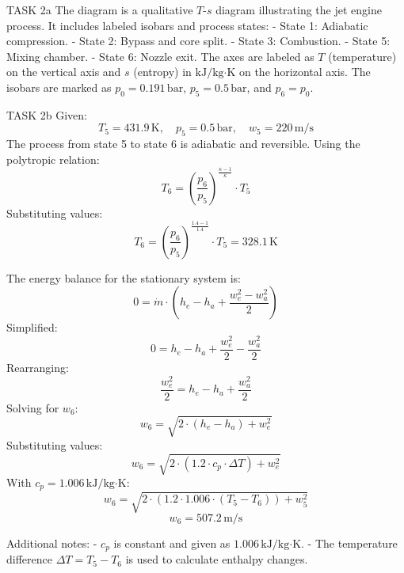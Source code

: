 TASK 2a  
The diagram is a qualitative \( T \)-\( s \) diagram illustrating the jet engine process. It includes labeled isobars and process states:  
- State 1: Adiabatic compression.  
- State 2: Bypass and core split.  
- State 3: Combustion.  
- State 5: Mixing chamber.  
- State 6: Nozzle exit.  
The axes are labeled as \( T \) (temperature) on the vertical axis and \( s \) (entropy) in \( \text{kJ}/\text{kg·K} \) on the horizontal axis. The isobars are marked as \( p_0 = 0.191 \, \text{bar} \), \( p_5 = 0.5 \, \text{bar} \), and \( p_6 = p_0 \).  

TASK 2b  
Given:  
\[
T_5 = 431.9 \, \text{K}, \quad p_5 = 0.5 \, \text{bar}, \quad w_5 = 220 \, \text{m/s}
\]  
The process from state 5 to state 6 is adiabatic and reversible. Using the polytropic relation:  
\[
T_6 = \left( \frac{p_6}{p_5} \right)^{\frac{\kappa - 1}{\kappa}} \cdot T_5
\]  
Substituting values:  
\[
T_6 = \left( \frac{p_6}{p_5} \right)^{\frac{1.4 - 1}{1.4}} \cdot T_5 = 328.1 \, \text{K}
\]  

The energy balance for the stationary system is:  
\[
0 = \dot{m} \cdot \left( h_e - h_a + \frac{w_e^2 - w_a^2}{2} \right)
\]  
Simplified:  
\[
0 = h_e - h_a + \frac{w_e^2}{2} - \frac{w_a^2}{2}
\]  
Rearranging:  
\[
\frac{w_e^2}{2} = h_e - h_a + \frac{w_a^2}{2}
\]  
Solving for \( w_6 \):  
\[
w_6 = \sqrt{2 \cdot (h_e - h_a) + w_e^2}
\]  
Substituting values:  
\[
w_6 = \sqrt{2 \cdot (1.2 \cdot c_p \cdot \Delta T) + w_e^2}
\]  
With \( c_p = 1.006 \, \text{kJ}/\text{kg·K} \):  
\[
w_6 = \sqrt{2 \cdot (1.2 \cdot 1.006 \cdot (T_5 - T_6)) + w_5^2}
\]  
\[
w_6 = 507.2 \, \text{m/s}
\]  

Additional notes:  
- \( c_p \) is constant and given as \( 1.006 \, \text{kJ}/\text{kg·K} \).  
- The temperature difference \( \Delta T = T_5 - T_6 \) is used to calculate enthalpy changes.